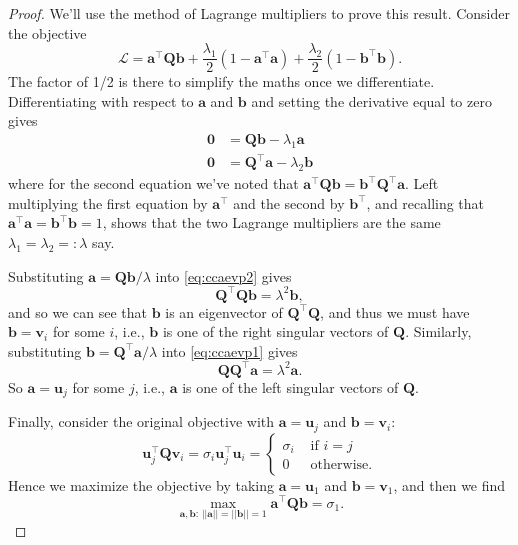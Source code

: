 \documentclass[
]{book}
\theoremstyle{definition}
\theoremstyle{definition}
\theoremstyle{definition}
\theoremstyle{definition}
\theoremstyle{remark}
\begin{document}
\begin{proof}
We'll use the method of Lagrange multipliers to prove this result. Consider the objective
\[\mathcal{L} = \mathbf a^\top \mathbf Q\mathbf b+\frac{\lambda_1}{2}(1-\mathbf a^\top\mathbf a)+\frac{\lambda_2}{2} (1-\mathbf b^\top \mathbf b).\]
The factor of 1/2 is there to simplify the maths once we differentiate.
Differentiating with respect to \(\mathbf a\) and \(\mathbf b\) and setting the derivative equal to zero gives
\begin{align}
{\boldsymbol 0}&= \mathbf Q\mathbf b-\lambda_1 \mathbf a\label{eq:ccaevp1}\\
{\boldsymbol 0}&= \mathbf Q^\top\mathbf a-\lambda_2 \mathbf b\label{eq:ccaevp2}
\end{align}
where for the second equation we've noted that \(\mathbf a^\top \mathbf Q\mathbf b= \mathbf b^\top \mathbf Q^\top \mathbf a\).
Left multiplying the first equation by \(\mathbf a^\top\) and the second by \(\mathbf b^\top\), and recalling that \(\mathbf a^\top \mathbf a=\mathbf b^\top\mathbf b=1\), shows that the two Lagrange multipliers are the same \(\lambda_1 = \lambda_2 =: \lambda\) say.

Substituting \(\mathbf a=\mathbf Q\mathbf b/\lambda\) into \eqref{eq:ccaevp2} gives
\[\mathbf Q^\top\mathbf Q\mathbf b= \lambda^2\mathbf b,\]
and so we can see that \(\mathbf b\) is an eigenvector of \(\mathbf Q^\top \mathbf Q\), and thus we must have \(\mathbf b= \mathbf v_i\) for some \(i\), i.e., \(\mathbf b\) is one of the right singular vectors of \(\mathbf Q\). Similarly, substituting \(\mathbf b= \mathbf Q^\top \mathbf a/\lambda\) into \eqref{eq:ccaevp1} gives
\[\mathbf Q\mathbf Q^\top \mathbf a= \lambda^2\mathbf a.\]
So \(\mathbf a=\mathbf u_j\) for some \(j\), i.e., \(\mathbf a\) is one of the left singular vectors of \(\mathbf Q\).

Finally, consider the original objective with \(\mathbf a=\mathbf u_j\) and \(\mathbf b=\mathbf v_i\):
\[\mathbf u_j^\top\mathbf Q\mathbf v_i = \sigma_i\mathbf u_j^\top \mathbf u_i = \begin{cases} \sigma_i &\mbox{ if } i = j\\
0 &\mbox{ otherwise.}
\end{cases}
\]
Hence we maximize the objective by taking \(\mathbf a=\mathbf u_1\) and \(\mathbf b=\mathbf v_1\), and then we find
\[\max_{\mathbf a, \mathbf b:\, \vert \vert \mathbf a\vert \vert=\vert \vert \mathbf b\vert \vert =1} \mathbf a^\top \mathbf Q\mathbf b=\sigma_1.\]
\end{proof}
\end{document}
